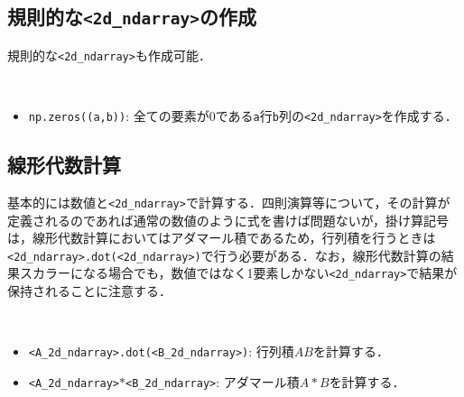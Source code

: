 \subsection{規則的な\texttt{<2d\_ndarray>}の作成}

規則的な\texttt{<2d\_ndarray>}も作成可能．
\begin{gram}　
\begin{itemize}
\item \texttt{np.zeros((a,b))}: 全ての要素が0である\texttt{a}行\texttt{b}列の\texttt{<2d\_ndarray>}を作成する．
\end{itemize}
\end{gram}

\begin{cod}[\texttt{num7.py}]　
}]{code/num7.py}
\vspace{-10pt}
\begin{lstlisting}
A=
[[0. 0. 0.]
 [0. 0. 0.]
 [0. 0. 0.]
 [0. 0. 0.]]
shape=(4, 3)
\end{lstlisting}
\end{cod}
\vspace{-10pt}

\subsection{線形代数計算}

基本的には数値と\texttt{<2d\_ndarray>}で計算する．四則演算等について，その計算が定義されるのであれば通常の数値のように式を書けば問題ないが，掛け算記号は，線形代数計算においてはアダマール積であるため，行列積を行うときは\texttt{<2d\_ndarray>.dot(<2d\_ndarray>)}で行う必要がある．なお，線形代数計算の結果スカラーになる場合でも，数値ではなく1要素しかない\texttt{<2d\_ndarray>}で結果が保持されることに注意する．

\begin{gram}　
\begin{itemize}
\item \texttt{<A\_2d\_ndarray>.dot(<B\_2d\_ndarray>)}: 行列積$AB$を計算する．
\item \texttt{<A\_2d\_ndarray>$*$<B\_2d\_ndarray>}: アダマール積$A*B$を計算する．
\end{itemize}
\end{gram}

\begin{cod}[\texttt{num6.py}]　
}]{code/num6.py}
\vspace{-10pt}
\begin{lstlisting}
F=
[[  78  156  234  312]
 [ 177  354  531  708]
 [ 276  552  828 1104]
 [ 375  750 1125 1500]]
G=
[[9040]]
H=
[[ -6  10]
 [ 12 -12]
 [-10   6]]
\end{lstlisting}
\end{cod}
\vspace{-10pt}

